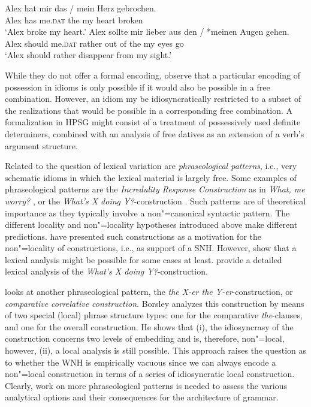 \documentclass[output=paper]{langsci/langscibook}
\begin{document}
\eal \label{ex-herz-augen}
\ex 
\gll Alex hat mir das / mein Herz gebrochen.\\
Alex has me.\textsc{dat} the {} my heart broken\\
\glt `Alex broke my heart.'\label{ex-herz}
\ex 
\gll Alex sollte mir lieber aus den / *meinen Augen gehen.\\
Alex should me.\textsc{dat} rather {out of} the {} my eyes go\\
\glt `Alex should rather disappear from my sight.'\label{ex-augen}
\zl 

While they do not offer a formal encoding, \cite{Markantonatou:Sailer:16} observe that a particular encoding of possession in idioms is only possible if it would also be possible in a free combination. However, an idiom my be idiosyncratically restricted to a subset of the realizations that would be possible in a corresponding free combination. A formalization in HPSG might consist of a treatment of possessively used definite determiners, combined with an analysis of free datives as an extension of a verb's argument structure.

 

Related to the question of lexical variation are \emph{phraseological patterns}, i.e., very schematic idioms 
in which the lexical material is largely free. Some examples 
of phraseological patterns are
  the \emph{Incredulity Response Construction} as in \emph{What, me worry?} \citep{Akmajian:84,Lambrecht:90}, 
or the \emph{What's X doing Y?}-construction \citep{KF99a}.
Such patterns are of theoretical importance as they typically involve a non"=canonical syntactic pattern. 
The different locality and non"=locality hypotheses introduced above make different predictions. 
\cite{FKoC88a} have presented such constructions as a motivation for the non"=locality of constructions, i.e., as support of a SNH. However, \cite{KF99a} show that a lexical analysis might be possible for some cases at least. 
\citeauthor{KF99a} provide a detailed lexical analysis of the \emph{What's X doing Y?}-construction. 

\cite{Borsley:04} looks at another phraseological pattern, the \emph{the X-er the Y-er}-construction, or \emph{comparative correlative construction}.
Borsley analyzes this construction by means of two special (local) phrase structure types: one for the comparative \emph{the}-clauses, and one for the overall construction. He shows that (i), the idiosyncrasy of the construction concerns two levels of embedding and is, therefore, non"=local, however, (ii),
a local analysis is still possible. This approach raises the question as to whether the WNH is empirically vacuous since we can always encode a non"=local construction in terms of a series of idiosyncratic local construction. 
Clearly, work on more phraseological patterns is needed to assess the various analytical options and their consequences for the architecture of grammar.
\end{document}
